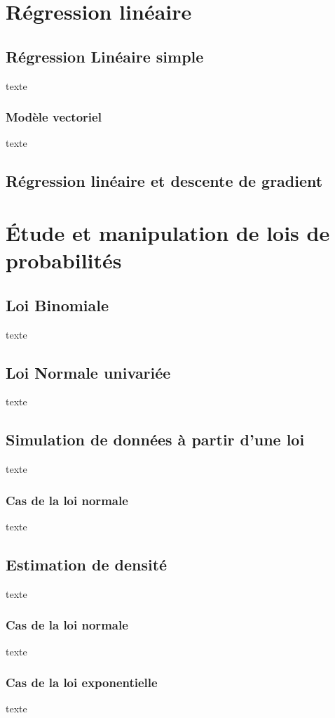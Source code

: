 \documentclass{article}      %
\begin{document}
\section{Régression linéaire}
\subsection{Régression Linéaire simple}
texte
\subsubsection{Modèle vectoriel}
texte

\subsection{Régression linéaire et descente de gradient}



\section{Étude et manipulation de lois de probabilités}
\subsection{Loi Binomiale}
texte
\subsection{Loi Normale univariée}
texte
\subsection{Simulation de données à partir d’une loi}
texte

\subsubsection{Cas de la loi normale}
texte

\subsection{Estimation de densité}
texte

\subsubsection{Cas de la loi normale}
texte
\subsubsection{Cas de la loi exponentielle}
texte
\end{document}
